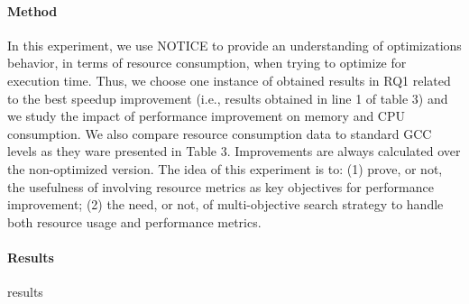 \paragraph{Method}
In this experiment, we use NOTICE to provide an understanding of optimizations behavior, in terms of resource consumption, when trying to optimize for execution time. Thus, we choose one instance of obtained results in RQ1 related to the best speedup improvement (i.e., results obtained in line 1 of table 3) and we study the impact of performance improvement on memory and CPU consumption. We also compare resource consumption data to standard GCC levels as they ware presented in Table 3. Improvements are always calculated over the non-optimized version. The idea of this experiment is to: (1) prove, or not, the usefulness of involving resource metrics as key objectives for performance improvement; (2) the need, or not, of multi-objective search strategy to handle both resource usage and performance metrics.



\paragraph{Results}

results

